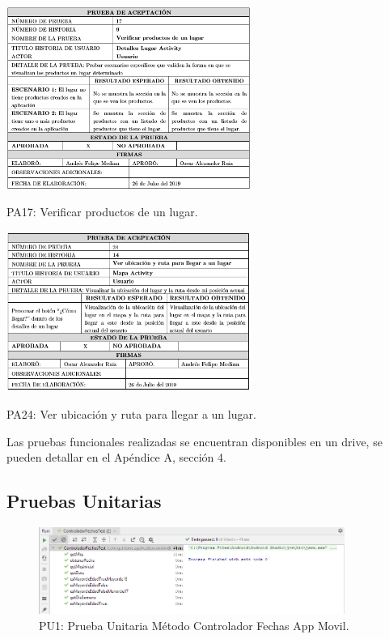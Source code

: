 \documentclass[12pt,letterpaper,openany]{book}
\begin{document}
\begin{table}[H]
\centering
\includegraphics[width=8cm]{./imagenes/PA/PA17}
\caption{PA17: Verificar productos de un lugar.}
\end{table}

\begin{table}[H]
\centering
\includegraphics[width=8cm]{./imagenes/PA/PA24}
\caption{PA24: Ver ubicación y ruta para llegar a un lugar.}
\end{table}

Las pruebas funcionales realizadas se encuentran disponibles en un drive, se pueden detallar en el Apéndice A, sección 4.

\subsection{Pruebas Unitarias}
\begin{figure}[H]
\begin{center}
\includegraphics[width=10cm]{./imagenes/Test/ControladorFechasTest}
\caption{PU1: Prueba Unitaria Método Controlador Fechas App Movil.}
\end{center}
\end{figure}
\end{document}
